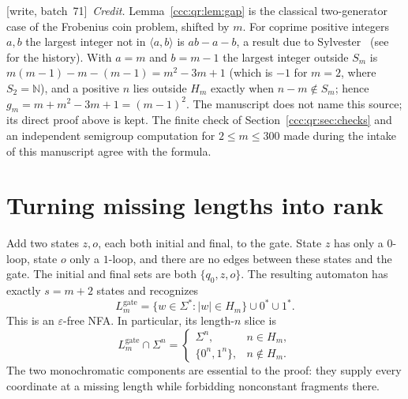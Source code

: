\documentclass[11pt,letterpaper]{article}
\theoremstyle{definition}
\theoremstyle{remark}
\newcommand{\N}{\mathbb N}
\newcommand{\eps}{\varepsilon}
\newcommand{\wsevone}{\textup{[write, batch~71]}}
\newcommand{\Lgate}[1]{L^{\mathrm{gate}}_{#1}}
\begin{document}
\wsevone\ \emph{Credit.} Lemma~\ref{ccc:qr:lem:gap} is the classical
two-generator case of the Frobenius coin problem, shifted by $m$. For
coprime positive integers $a,b$ the largest integer not in $\langle a,b\rangle$
is $ab-a-b$, a result due to Sylvester~\cite{Sylvester}
(see~\cite{RamirezAlfonsin} for the history). With $a=m$ and $b=m-1$ the
largest integer outside $S_m$ is $m(m-1)-m-(m-1)=m^2-3m+1$ (which is $-1$
for $m=2$, where $S_2=\N$), and a positive $n$ lies outside $H_m$ exactly
when $n-m\notin S_m$; hence $g_m=m+m^2-3m+1=(m-1)^2$. The manuscript does
not name this source; its direct proof above is kept. The finite check of
Section~\ref{ccc:qr:sec:checks} and an independent semigroup computation for
$2\le m\le300$ made during the intake of this manuscript agree with the
formula.

\section{Turning missing lengths into rank}\label{ccc:qr:sec:construction}

Add two states $z,o$, each both initial and final, to the gate. State $z$ has
only a $0$-loop, state $o$ only a $1$-loop, and there are no edges between
these states and the gate. The initial and final sets are both
$\{q_0,z,o\}$. The resulting automaton has exactly $s=m+2$ states and
recognizes
\begin{equation}\label{ccc:qr:eq:language}
\Lgate m=\{w\in\Sigma^*:|w|\in H_m\}\cup0^*\cup1^*.
\end{equation}
This is an $\eps$-free NFA. In particular, its length-$n$ slice is
\begin{equation}\label{ccc:qr:eq:slice}
\Lgate m\cap\Sigma^n=
\begin{cases}
\Sigma^n,&n\in H_m,\\
\{0^n,1^n\},&n\notin H_m.
\end{cases}
\end{equation}
The two monochromatic components are essential to the proof: they supply
every coordinate at a missing length while forbidding nonconstant fragments
there.
\end{document}
